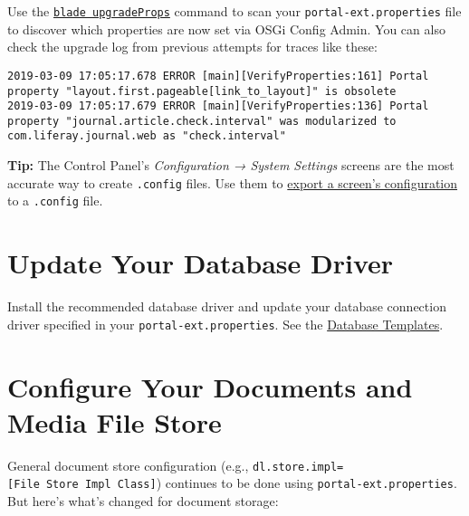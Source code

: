Use the
\href{/docs/7-2/reference/-/knowledge_base/r/blade-cli}{\texttt{blade\ upgradeProps}}
command to scan your \texttt{portal-ext.properties} file to discover
which properties are now set via OSGi Config Admin. You can also check
the upgrade log from previous attempts for traces like these:

\begin{verbatim}
2019-03-09 17:05:17.678 ERROR [main][VerifyProperties:161] Portal property "layout.first.pageable[link_to_layout]" is obsolete
2019-03-09 17:05:17.679 ERROR [main][VerifyProperties:136] Portal property "journal.article.check.interval" was modularized to com.liferay.journal.web as "check.interval"
\end{verbatim}

\noindent\hrulefill

\textbf{Tip:} The Control Panel's \emph{Configuration → System Settings}
screens are the most accurate way to create \texttt{.config} files. Use
them to
\href{/docs/7-2/user/-/knowledge_base/u/system-settings\#exporting-and-importing-configurations}{export
a screen's configuration} to a \texttt{.config} file.

\noindent\hrulefill

\section{Update Your Database Driver}\label{update-your-database-driver}

Install the recommended database driver and update your database
connection driver specified in your \texttt{portal-ext.properties}. See
the
\href{/docs/7-2/deploy/-/knowledge_base/d/database-templates}{Database
Templates}.

\section{Configure Your Documents and Media File
Store}\label{configure-your-documents-and-media-file-store}

General document store configuration (e.g.,
\texttt{dl.store.impl={[}File\ Store\ Impl\ Class{]}}) continues to be
done using \texttt{portal-ext.properties}. But here's what's changed for
document storage:

